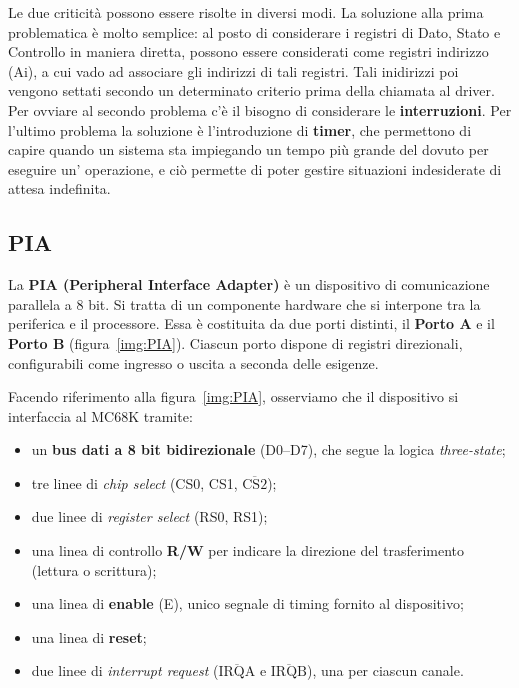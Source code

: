 Le due criticità possono essere risolte in diversi modi. La soluzione alla prima problematica è molto semplice: al posto di considerare i registri di Dato, Stato e Controllo in maniera diretta, possono essere considerati come registri indirizzo (Ai), a cui vado ad associare gli indirizzi di tali registri. Tali inidirizzi poi vengono settati secondo un determinato criterio prima della chiamata al driver.
Per ovviare al secondo problema c'è il bisogno di considerare le \textbf{interruzioni}. Per l'ultimo problema la soluzione è l'introduzione di \textbf{timer}, che permettono di capire quando un sistema sta impiegando un tempo più grande del dovuto per eseguire un' operazione, e ciò permette di poter gestire situazioni indesiderate di attesa indefinita.


\subsection{PIA} \label{par:PIA}

La \textbf{PIA (Peripheral Interface Adapter)} è un dispositivo di comunicazione parallela a 8 bit. 
Si tratta di un componente hardware che si interpone tra la periferica e il processore. 
Essa è costituita da due porti distinti, il \textbf{Porto A} e il \textbf{Porto B} (figura~\ref{img:PIA}). 
Ciascun porto dispone di registri direzionali, configurabili come ingresso o uscita a seconda delle esigenze.

Facendo riferimento alla figura~\ref{img:PIA}, osserviamo che il dispositivo si interfaccia al MC68K tramite:
\begin{itemize}
    \item un \textbf{bus dati a 8 bit bidirezionale} (D0--D7), che segue la logica \textit{three-state};
    \item tre linee di \textit{chip select} (CS0, CS1, $\overline{\mathrm{CS2}}$);
    \item due linee di \textit{register select} (RS0, RS1);
    \item una linea di controllo \textbf{R/W} per indicare la direzione del trasferimento (lettura o scrittura);
    \item una linea di \textbf{enable} (E), unico segnale di timing fornito al dispositivo;
    \item una linea di \textbf{reset};
    \item due linee di \textit{interrupt request} ($\overline{\mathrm{IRQA}}$ e $\overline{\mathrm{IRQB}}$), una per ciascun canale.
\end{itemize}

